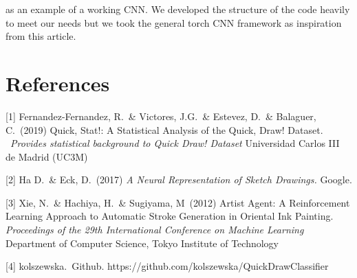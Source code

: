 \documentclass{article}
\begin{document}
as an example of a working CNN. We developed the structure of the code
heavily to meet our needs but we took the general torch CNN framework as inspiration
from this article.

\section*{References}

\small

[1] Fernandez-Fernandez, R.\ \& Victores, J.G.\ \& Estevez, D.\ \& Balaguer, C.\ (2019) Quick, Stat!: A Statistical Analysis of the Quick, Draw! Dataset.
\ {\it Provides statistical background
to Quick Draw! Dataset} Universidad Carlos III de Madrid (UC3M)

[2] Ha D.\ \& Eck, D.\ (2017) {\it A Neural Representation of Sketch Drawings.}
Google.

[3] Xie, N.\ \& Hachiya, H.\ \& Sugiyama, M\ (2012) Artist Agent: A Reinforcement Learning
Approach to Automatic Stroke Generation in Oriental Ink Painting. {\it Proceedings of the 29th International Conference
on Machine Learning} Department of Computer Science, Tokyo Institute of Technology

[4] kolszewska.\ Github. https://github.com/kolszewska/QuickDrawClassifier
\end{document}
